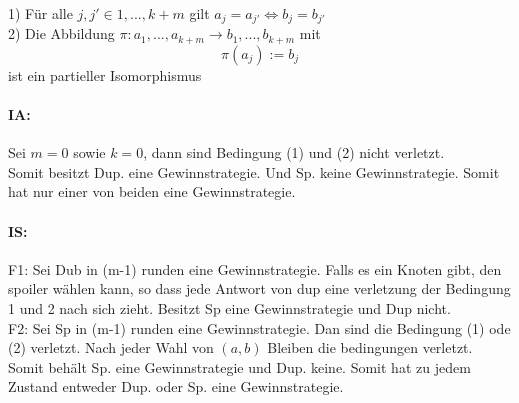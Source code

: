 \documentclass[12pt]{article}
\begin{document}
1) Für alle $j,j'\in {1,...,k+m}$ gilt $a_j=a_{j'} \Leftrightarrow b_j = b_{j'}$ \\
2) Die Abbildung $\pi: {a_1,...,a_{k+m}} \rightarrow {b_1,...,b_{k+m}}$ mit 
\[ \pi(a_j):=b_j \] 
ist ein partieller Isomorphismus

\paragraph{IA:}
Sei $m=0$ sowie $k=0$, dann sind Bedingung (1) und (2) nicht verletzt. \\
Somit besitzt Dup. eine Gewinnstrategie. Und Sp. keine Gewinnstrategie.
Somit hat nur einer von beiden eine Gewinnstrategie.
\paragraph{IS:}
F1: Sei Dub in (m-1) runden eine Gewinnstrategie. Falls es ein Knoten gibt, den spoiler wählen kann, so dass jede Antwort von dup eine verletzung der Bedingung 1 und 2 nach sich zieht. Besitzt Sp eine Gewinnstrategie und Dup nicht. \\
F2: Sei Sp in (m-1) runden eine Gewinnstrategie. Dan sind die Bedingung (1) ode (2) verletzt. Nach jeder Wahl von $(a,b)$ Bleiben die bedingungen verletzt. Somit behält Sp. eine Gewinnstrategie und Dup. keine.
Somit hat zu jedem Zustand entweder Dup. oder Sp. eine Gewinnstrategie.
\end{document}
